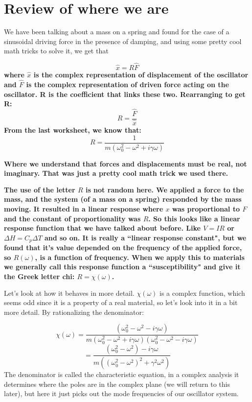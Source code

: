 \documentclass[]{revtex4}
\newcommand{\st}[1]{{\color{red}\bfseries #1}}
\begin{document}
  \section*{Review of where we are}
  
  We have been talking about a mass on a spring and found for the case of a sinusoidal driving force in the presence of
  damping, and using some pretty cool math tricks to solve it, we get that
  
  \[\hat{x} = R\widehat{F}\]
  \st{
    where $\hat{x}$ is the complex representation of displacement of the oscillator and $\hat{F}$ is the complex representation of driven force acting on the oscillator. R is the coefficient that links these two. Rearranging to get R:
  }
  \[R = \frac{\widehat{F}}{\hat{x}}\]
  \st{
    From the last worksheet, we know that:
  }
  \[R = \frac{1}{m(\omega_0^2-\omega^2+i\gamma\omega)}\]
  
  \st{Where we understand that forces and displacements must be real, not imaginary.  That was just a pretty cool math trick we used there.}
  
  \st{The use of the letter $R$ is not random here.  We applied a force to the mass, and the system (of a mass on a spring) responded by the mass moving.
    It resulted in a linear response where $x$ was proportional to $F$ and the constant of proportionality was $R$.  So this looks like a linear
    response function that we have talked about before.  Like $V=IR$ or $\Delta H = C_p\Delta T$ and so on.   It is really a ``linear response constant",
    but we found that it's value depended on the frequency of the applied force, so $R(\omega)$, is a function of frequency.  When we apply this to materials
    we generally call this response function a ``susceptibility" and give it the Greek letter chi: $R=\chi(\omega)$.
    
    Let's look at how it behaves in more detail.  $\chi(\omega)$ is a complex function, which seems odd since it is a property of a real material, so let's
    look into it in a bit more detail. 
    By rationalizing the denominator:}
  
  \[\chi(\omega)=\frac{(\omega_0^2-\omega^2-i\gamma\omega)}{m(\omega_0^2-\omega^2+i\gamma\omega)(\omega_0^2-\omega^2-i\gamma\omega)}\]
  \[=\frac{(\omega_0^2-\omega^2)-i\gamma\omega}{m((\omega_0^2-\omega^2)^2+\gamma^2\omega^2)}\]
  The denominator is called the characteristic equation, in a complex analysis it determines where the poles are in the complex plane (we will return to this later), but here it just picks out
  the mode frequencies of our oscillator system.
  
\end{document}
